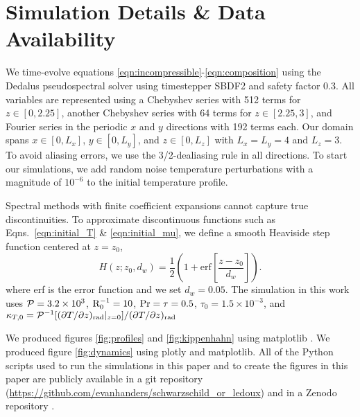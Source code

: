\section{Simulation Details \& Data Availability}
\label{app:simulation_details}
We time-evolve equations \ref{eqn:incompressible}-\ref{eqn:composition} using the Dedalus pseudospectral solver \citep[git commit 1339061]{burns_etal_2020} using timestepper SBDF2 \citep{wang_ruuth_2008} and safety factor 0.3.
All variables are represented using a Chebyshev series with 512 terms for $z \in [0, 2.25]$, another Chebyshev series with 64 terms for $z \in [2.25, 3]$, and Fourier series in the periodic $x$ and $y$ directions with 192 terms each.
Our domain spans $x \in [0, L_x]$, $y \in [0, L_y]$, and $z \in [0, L_z]$ with $L_x = L_y = 4$ and $L_z = 3$.
To avoid aliasing errors, we use the 3/2-dealiasing rule in all directions.
To start our simulations, we add random noise temperature perturbations with a magnitude of $10^{-6}$ to the initial temperature profile.

Spectral methods with finite coefficient expansions cannot capture true discontinuities.
To approximate discontinuous functions such as Eqns.~\ref{eqn:initial_T} \& \ref{eqn:initial_mu}, we define a smooth Heaviside step function centered at $z = z_0$,
\begin{equation}
H(z; z_0, d_w) = \frac{1}{2}\left(1 + \mathrm{erf}\left[\frac{z - z_0}{d_w}\right]\right).
\label{eqn:heaviside}
\end{equation}
where erf is the error function and we set $d_w = 0.05$.
The simulation in this work uses $\mathcal{P} = 3.2 \times 10^3$, $\mathrm{R}_{0}^{-1} = 10$, $\rm{Pr} = \tau = 0.5$, $\tau_0 = 1.5 \times 10^{-3}$, and ${\kappa_{T,0} = \mathcal{P}^{-1}[(\partial T/\partial z)_{\rm{rad}}|_{z=0}] / (\partial T/\partial z)_{\rm{rad}}}$

We produced figures \ref{fig:profiles} and \ref{fig:kippenhahn} using matplotlib \citep{hunter2007, mpl3.3.4}.
We produced figure \ref{fig:dynamics} using plotly \citep{plotly} and matplotlib.
All of the Python scripts used to run the simulations in this paper and to create the figures in this paper are publicly available in a git repository (\url{https://github.com/evanhanders/schwarzschild_or_ledoux}) and in a Zenodo repository \citep{supp}.
